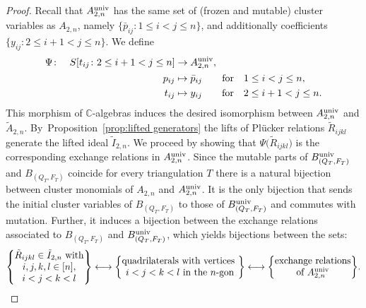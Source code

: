 \documentclass[10pt,a4paper]{amsart}
\numberwithin{equation}{section}
\begin{document}
\begin{proof}
Recall that $A_{2,n}^{\rm univ}$ has the same set of (frozen and mutable) cluster variables as $A_{2,n}$, namely $\{\bar p_{ij}\colon 1\le i<j\le n\}$, and additionally coefficients $\{y_{ij}\colon 2\le i+1<j\le n\}$.
We define
\begin{displaymath}\begin{split}
\Psi\colon\quad S[t_{ij}\colon 2\le i+1<j\le n] &\to A_{2,n}^{\rm univ},\\
 p_{ij} &\mapsto \bar p_{ij} \qquad \text{for}\quad 1\le i<j\le n, \\
t_{ij} &\mapsto y_{ij}\qquad \text{for}\quad 2\le i+1<j\le n.
\end{split}
\end{displaymath}
This morphism of $\mathbb C$-algebras induces the desired isomorphism between $A_{2,n}^{\rm univ}$ and $\tilde A_{2,n}$.
By~Pro\-po\-si\-tion~\ref{prop:lifted generators} the lifts of Pl\"ucker relations $\tilde R_{ijkl}$ generate the lifted ideal $\tilde I_{2,n}$.
We proceed by showing that $\Psi\big(\tilde R_{ijkl}\big)$ is the corresponding exchange relations in $A^{\rm univ}_{2,n}$.
Since the mutable parts of $B^{\rm univ}_{(Q_T,F_T)}$ and $B_{(Q_T,F_T)}$ coincide for every triangulation $T$ there is a natural bijection between cluster monomials of $A_{2,n}$ and $A_{2,n}^{\rm univ}$.
It is the only bijection that sends the initial cluster variables of $B_{(Q_T,F_T)}$ to those of $B^{\rm univ}_{(Q_T,F_T)}$ and commutes with mutation.
Further, it induces a bijection between the exchange relations associated to $B_{(Q_T,F_T)}$ and $B^{\rm univ}_{(Q_T,F_T)}$, which yields bijections between the sets:
\begin{displaymath}
 \left\{\begin{matrix}
 \tilde R_{ijkl}\in \tilde I_{2,n} \text{ with} \\
 i,j,k,l\in [n],\\
 i<j<k<l
 \end{matrix}\right\}
\longleftrightarrow
 \left\{\begin{matrix}
 \text{quadrilaterals with vertices } \\
 i<j<k<l \text{ in the $n$-gon}
 \end{matrix}\right\}
\longleftrightarrow
 \left\{\begin{matrix}
 \text{exchange relations}\\
 \text{of } A_{2,n}^{\rm univ}
 \end{matrix}\right\}\!.
\end{displaymath}

\end{proof}
\end{document}
